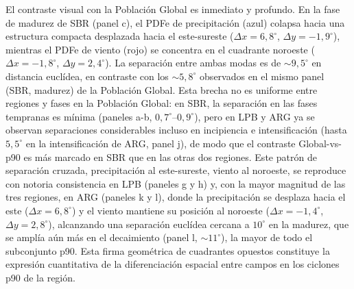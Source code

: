 El contraste visual con la Población Global es inmediato y profundo. En la fase de madurez de SBR (panel c), el PDFe de precipitación (azul) colapsa hacia una estructura compacta desplazada hacia el este-sureste ($\Delta x = 6{,}8^{\circ}$, $\Delta y = -1{,}9^{\circ}$), mientras el PDFe de viento (rojo) se concentra en el cuadrante noroeste ($\Delta x = -1{,}8^{\circ}$, $\Delta y = 2{,}4^{\circ}$). La separación entre ambas modas es de ${\sim}9{,}5^{\circ}$ en distancia euclídea, en contraste con los ${\sim}5{,}8^{\circ}$ observados en el mismo panel (SBR, madurez) de la Población Global. Esta brecha no es uniforme entre regiones y fases en la Población Global: en SBR, la separación en las fases tempranas es mínima (paneles a-b, $0{,}7^{\circ}$--$0{,}9^{\circ}$), pero en LPB y ARG ya se observan separaciones considerables incluso en incipiencia e intensificación (hasta $5{,}5^{\circ}$ en la intensificación de ARG, panel j), de modo que el contraste Global-vs-p90 es más marcado en SBR que en las otras dos regiones. Este patrón de separación cruzada, precipitación al este-sureste, viento al noroeste, se reproduce con notoria consistencia en LPB (paneles g y h) y, con la mayor magnitud de las tres regiones, en ARG (paneles k y l), donde la precipitación se desplaza hacia el este ($\Delta x = 6{,}8^{\circ}$) y el viento mantiene su posición al noroeste ($\Delta x = -1{,}4^{\circ}$, $\Delta y = 2{,}8^{\circ}$), alcanzando una separación euclídea cercana a $10^{\circ}$ en la madurez, que se amplía aún más en el decaimiento (panel l, ${\sim}11^{\circ}$), la mayor de todo el subconjunto p90. Esta firma geométrica de cuadrantes opuestos constituye la expresión cuantitativa de la diferenciación espacial entre campos en los ciclones p90 de la región.

